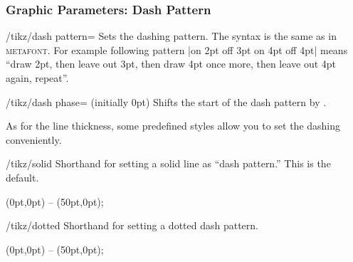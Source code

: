 \subsubsection{Graphic Parameters: Dash Pattern}

\begin{key}{/tikz/dash pattern=}
  Sets the dashing pattern. The syntax is the same as in
  \textsc{metafont}. For example following pattern
  |on 2pt off 3pt on 4pt off 4pt| means ``draw
  2pt, then leave out 3pt, then draw 4pt once more, then leave out 4pt
  again, repeat''. 

\begin{codeexample}[]
\begin{tikzpicture}[dash pattern=on 2pt off 3pt on 4pt off 4pt]
  \draw (0pt,0pt) -- (3.5cm,0pt);
\end{tikzpicture}
\end{codeexample}
\end{key}

\begin{key}{/tikz/dash phase= (initially 0pt)}
  Shifts the start of the dash pattern by .

\begin{codeexample}[]
\begin{tikzpicture}[dash pattern=on 20pt off 10pt]
  \draw[dash phase=0pt] (0pt,3pt) -- (3.5cm,3pt);
  \draw[dash phase=10pt] (0pt,0pt) -- (3.5cm,0pt);
\end{tikzpicture}
\end{codeexample}
\end{key}

As for the line thickness, some predefined styles allow you to set the
dashing conveniently.

\begin{stylekey}{/tikz/solid}
  Shorthand for setting a solid line as ``dash pattern.'' This is the default.

\begin{codeexample}[]
\tikz \draw[solid] (0pt,0pt) -- (50pt,0pt);
\end{codeexample}
\end{stylekey}

\begin{stylekey}{/tikz/dotted}
  Shorthand for setting a dotted dash pattern.

\begin{codeexample}[]
\tikz \draw[dotted] (0pt,0pt) -- (50pt,0pt);
\end{codeexample}
\end{stylekey}

